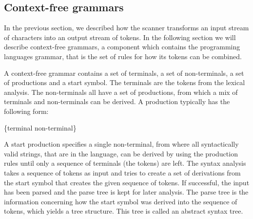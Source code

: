 \subsection{Context-free grammars}
\label{sec:context-freegrammars}

In the previous section, we described how the scanner transforms an input stream
of characters into an output stream of tokens. In the following section we will
describe context-free grammars, a component which contains the programming
languages grammar, that is the set of rules for how its tokens can be combined.

A context-free grammar contains a set of terminals, a set of non-terminals, a
set of productions and a start symbol. The terminals are the tokens from the
lexical analysis. The non-terminals all have a set of productions, from which a
mix of terminals and non-terminals can be derived. A production typically
has the following form:

\begin{ebnf}
 {\{terminal \gor \gcat non-terminal\}}
\end{ebnf}

A start production specifies a single non-terminal, from where all syntactically
valid strings, that are in the language, can be derived by using the
production rules until only a sequence of terminals (the tokens) are left. The
syntax analysis takes a sequence of tokens as input and tries to create a set of
derivations from the start symbol that creates the given sequence of tokens. If
successful, the input has been parsed and the parse tree is kept for later
analysis. The parse tree is the information concerning how the start symbol was
derived into the sequence of tokens, which yields a tree structure. This tree
is called an abstract syntax tree.


